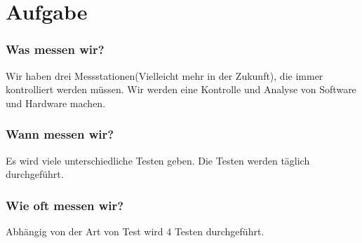 \section{Aufgabe}
		\subsubsection{Was messen wir?}
		Wir haben drei Messstationen(Vielleicht mehr in der Zukunft), die immer kontrolliert werden müssen.
		Wir werden eine Kontrolle und Analyse von Software und Hardware machen.
		\subsubsection{Wann messen wir?}
		Es wird viele unterschiedliche Testen geben. Die Testen werden täglich durchgeführt.
		\subsubsection{Wie oft messen wir?}
		Abhängig von der Art von Test wird 4 Testen durchgeführt.